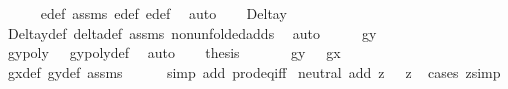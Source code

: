 \begin{isabellebody}
\ \ \ \ \isamarkupfalse%
\ e{}{\isacharunderscore}def\ assms{\isacharparenleft}{}{}{\isacharminus}{}{}{\isacharparenright}\ e{}{\isacharunderscore}def\ e{}{\isacharunderscore}def\ \isamarkupfalse%
\ auto\isanewline
\ \ \isamarkupfalse%
\ {\isachardoublequoteopen}Delta\isactrlsub y\ {\isasymnoteq}\ {}{\isachardoublequoteclose}\ \isanewline
\ \ \ \ \isamarkupfalse%
\ Delta\isactrlsub y{\isacharunderscore}def\ delta{\isacharunderscore}def\ assms{\isacharparenleft}{}{\isacharminus}{}{}{\isacharparenright}\ non{\isacharunderscore}unfolded{\isacharunderscore}adds\ \isamarkupfalse%
\ auto\isanewline
\ \ \isamarkupfalse%
\ \isamarkupfalse%
\ {\isachardoublequoteopen}g\isactrlsub y\ {\isacharequal}\ {}{\isachardoublequoteclose}\ \isanewline
\ \ \ \ \isamarkupfalse%
\ {\isacartoucheopen}gypoly\ {\isacharequal}\ {}{\isacartoucheclose}\ gypoly{\isacharunderscore}def\ \isamarkupfalse%
\ auto\isanewline
\isanewline
\ \ \isamarkupfalse%
\ {\isacharquery}thesis\ \isanewline
\ \ \ \ \isamarkupfalse%
\ {\isacartoucheopen}g\isactrlsub y\ {\isacharequal}\ {}{\isacartoucheclose}\ {\isacartoucheopen}g\isactrlsub x\ {\isacharequal}\ {}{\isacartoucheclose}\ \isanewline
\ \ \ \ \isamarkupfalse%
\ g\isactrlsub x{\isacharunderscore}def\ g\isactrlsub y{\isacharunderscore}def\ assms{\isacharparenleft}{}{\isacharcomma}{}{\isacharparenright}\isanewline
\ \ \ \ \isamarkupfalse%
\ {\isacharparenleft}simp\ add{\isacharcolon}\ prod{\isacharunderscore}eq{\isacharunderscore}iff{\isacharparenright}\isanewline
{}\isamarkupfalse%
%
\endisatagproof
{\isafoldproof}%
%
\isadelimproof
\isanewline
%
\endisadelimproof
\isanewline
{}\isamarkupfalse%
\ neutral{\isacharcolon}\ {\isachardoublequoteopen}add\ z\ {\isacharparenleft}{}{\isacharcomma}{}{\isacharparenright}\ {\isacharequal}\ z{\isachardoublequoteclose}%
\isadelimproof
\ %
\endisadelimproof
%
\isatagproof
{}\isamarkupfalse%
{\isacharparenleft}cases\ {\isachardoublequoteopen}z{\isachardoublequoteclose}{\isacharcomma}simp{\isacharparenright}%
\endisatagproof
{\isafoldproof}%
%
\isadelimproof
%
\endisadelimproof
\isanewline
\isanewline
{}\isamarkupfalse%

\end{isabellebody}

